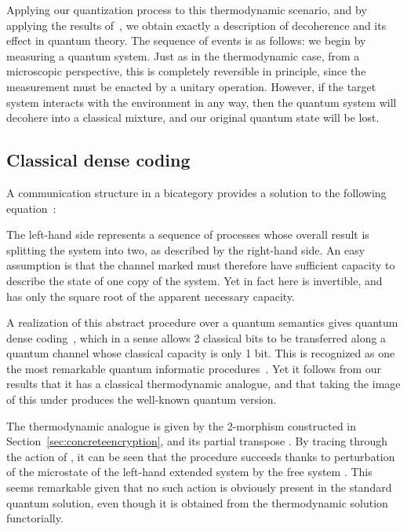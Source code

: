 \documentclass[a4paper,12pt]{article}
\theoremstyle{definition}
\renewcommand{\-}[0]{\nobreakdash-\hspace{0pt}}
\begin{document}
Applying our quantization process  to this thermodynamic scenario, and by applying the results of~\cite{v12-hqt, v12-hsqp},  we obtain exactly a description of decoherence and its effect in quantum theory. The sequence of events is as follows: we begin by measuring a quantum system. Just as in the thermodynamic case, from a microscopic perspective, this is completely reversible in principle, since the measurement must be enacted by a unitary operation. However, if the target system interacts with the environment in any way, then the quantum system will decohere into a classical mixture, and our original quantum state will be lost.

\subsection{Classical dense coding}
\label{sec:densecoding}

\noindent
A communication structure in a bicategory provides a solution to the following equation~\cite{v12-hqt, v12-hsqp}:

The left-hand side represents a sequence of processes whose overall result is splitting the system into two, as described by the right-hand side. An easy assumption is that the channel marked  must therefore have sufficient capacity to describe the state of one copy of the system. Yet in fact  here is invertible, and  has only the square root of the apparent necessary capacity.

A realization of this abstract procedure over a quantum semantics gives quantum dense coding~\cite{v12-hqt}, which in a sense allows 2 classical bits to be transferred along a quantum channel whose classical capacity is only 1 bit. This is recognized as one the most remarkable quantum informatic procedures~\cite{bw92}. Yet it follows from our results that it has a classical thermodynamic analogue, and that taking the image of this under  produces the well-known quantum version.

The thermodynamic analogue is given by the 2\-morphism  constructed in Section~\ref{sec:concreteencryption}, and its partial transpose . By tracing through the action of , it can be seen that the procedure succeeds thanks to perturbation of the microstate of the left-hand extended system by the free system . This seems remarkable given that no such action is obviously present in the standard quantum solution, even though it is obtained from the thermodynamic solution functorially.
\end{document}
